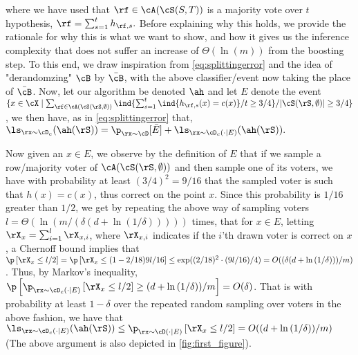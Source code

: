   \vspace{-0.4cm}\newline
where we have used that $\rf\in  \cA(\cS(S,T)) $ is a majority vote over $ t $ hypothesis, $ \rf=\sum_{s=1}^{t} h_{\rf,s}.$     
Before explaining why this holds, we provide the rationale for why this is what we want to show, and how it gives us the inference complexity that does not suffer an increase of $ \Theta(\ln{(m )}) $  from the boosting step. To this end, we draw inspiration from \cite{baggingoptimalPAClearner} \cref{eq:splittingerror} and the idea of "derandomzing" $ \cB $ by $ \bar{\cB} $, with the above classifier/event now taking the place of $ \bar{\cB} $. Now, let our algorithm be denoted $ \ah $ and let $ E $ denote the event $ \{x\in \cX \mid  \sum_{\rf\in \cA(\cS(\rS,\emptyset))} \ind\{\sum_{s=1}^{t} \ind\{h_{\rf,s}(x)=c(x)\}/t\geq 3/4\}/|\cS(\rS,\emptyset)|
\geq 3/4 \}$, we then have,  as in \cref{eq:splittingerror} that,
$\ls_{\rx\sim\cD_{c}}(\ah(\rS)) = \p_{\rx\sim\cD}[\bar{E}]+\ls_{\rx\sim\cD_{c}(\cdot \mid E)}(\ah(\rS)).$

Now given an $ x\in E $, we observe by the definition of $ E $ that if we sample a row/majority voter of $ \cA(\cS(\rS,\emptyset)) $ and then sample one of its voters, we have with probability at least $ (3/4)^{2}=9/16 $ that the sampled voter is such that $ h(x)=c(x) $, thus correct on the point $ x $. Since this probability is $1/16 $ greater than $ 1/2 $,  we get by repeating the above way of sampling voters $l= \Theta(\ln{\left(m/(\delta(d+\ln{\left(1/\delta \right)})) \right)} )$ times, that for $ x\in E $, letting $ \rX_{x}=\sum_{i=1}^{l}\rX_{x,i} $, where $ \rX_{x,i} $ indicates if the $ i $'th drawn voter is correct on $ x $, a Chernoff bound implies that $\p\left[\rX_{x}\leq l/2\right]= \p\left[\rX_{x}\leq (1-2/18)9l/16\right]\leq \exp((2/18)^{2}\cdot(9l/16)/4)=O((\delta(d+\ln{\left(1/\delta \right)}))/m )$. Thus, by Markov's inequality, $ \p\left[\p_{\rx\sim\cD_{c}(\cdot\mid E)}\left[\rX_{x}\leq l/2\right]\geq (d+\ln{\left(1/\delta \right)})/m \right]=O(\delta)$. That is with probability at least $ 1-\delta $ over the repeated random sampling over voters in the above fashion, we have that $\ls_{\rx\sim\cD_{c}(\cdot \mid E)}(\ah(\rS))\leq \p_{\rx\sim\cD(\cdot|E)}\left[\rX_{x}\leq l/2\right]=O((d+\ln{\left(1/\delta \right)})/m)  $ (The above argument is also depicted in \cref{fig:first_figure}). 

